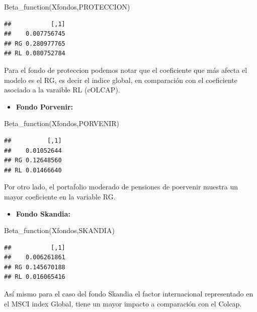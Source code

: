 \documentclass[
  12pt,
]{article}
\newenvironment{Shaded}{\begin{snugshade}}{\end{snugshade}}
\newcommand{\FunctionTok}[1]{\textcolor[rgb]{0.00,0.00,0.00}{#1}}
\newcommand{\NormalTok}[1]{#1}
\providecommand{\tightlist}{%
  \setlength{\itemsep}{0pt}\setlength{\parskip}{0pt}}
\begin{document}
\begin{Shaded}
\begin{Highlighting}[]
\FunctionTok{Beta\_function}\NormalTok{(Xfondos,PROTECCION)}
\end{Highlighting}
\end{Shaded}

\begin{verbatim}
##           [,1]
##    0.007756745
## RG 0.280977765
## RL 0.080752784
\end{verbatim}

Para el fondo de proteccion podemos notar que el coeficiente que más
afecta el modelo es el RG, es decir el indice global, en comparación con
el coeficiente asociado a la varaible RL (cOLCAP).

\begin{itemize}
\tightlist
\item
  \textbf{Fondo Porvenir:}
\end{itemize}

\begin{Shaded}
\begin{Highlighting}[]
\FunctionTok{Beta\_function}\NormalTok{(Xfondos,PORVENIR)}
\end{Highlighting}
\end{Shaded}

\begin{verbatim}
##          [,1]
##    0.01052644
## RG 0.12648560
## RL 0.01466640
\end{verbatim}

Por otro lado, el portafolio moderado de pensiones de poervenir muestra
un mayor coeficiente en la variable RG.

\begin{itemize}
\tightlist
\item
  \textbf{Fondo Skandia:}
\end{itemize}

\begin{Shaded}
\begin{Highlighting}[]
\FunctionTok{Beta\_function}\NormalTok{(Xfondos,SKANDIA)}
\end{Highlighting}
\end{Shaded}

\begin{verbatim}
##           [,1]
##    0.006261861
## RG 0.145670188
## RL 0.016065416
\end{verbatim}

Así mismo para el caso del fondo Skandia el factor internacional
representado en el MSCI index Global, tiene un mayor impacto a
comparación con el Colcap.
\end{document}

